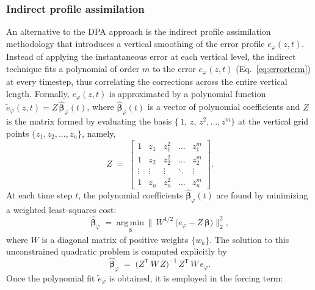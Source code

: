 \subsubsection{Indirect profile assimilation}
\label{subsec:ipa}
An alternative to the DPA approach is the indirect profile assimilation methodology \citep{allaerts2020development} that introduces a vertical smoothing of the error profile $e_\varphi(z,t)$. Instead of applying the instantaneous error at each vertical level, the indirect technique fits a polynomial of order \(m\) to the error $e_\varphi(z,t)$ (Eq.~\ref{eq:errorterm}) at every timestep, thus correlating the corrections across the entire vertical length. Formally, \(e_{\varphi}(z,t)\) is approximated by a polynomial function
\(\widetilde{e}_{\varphi}(z,t) = Z\,\hat{\boldsymbol{\beta}}_{\varphi}(t)\), where \(\hat{\boldsymbol{\beta}}_{\varphi}(t)\)
is a vector of polynomial coefficients and \(Z\) is the matrix formed by evaluating the basis \( \{\,1,\,z,\,z^{2},\dots,z^{m}\} \) at the vertical grid points \(\{z_{1},z_{2},\dots,z_{n}\}\), namely,
%
\begin{equation*}
  Z \;=\;
  \begin{bmatrix}
    1      & z_{1}   & z_{1}^{2} & \dots  & z_{1}^{m}\\
    1      & z_{2}   & z_{2}^{2} & \dots  & z_{2}^{m}\\
    \vdots & \vdots  & \vdots    & \ddots & \vdots   \\
    1      & z_{n}   & z_{n}^{2} & \dots  & z_{n}^{m}
  \end{bmatrix}.
\end{equation*}
%
At each time step \(t\), the polynomial coefficients \(\hat{\boldsymbol{\beta}}_{\varphi}(t)\) are found by
minimizing a weighted least-squares cost:
%
\begin{equation}
  \hat{\boldsymbol{\beta}}_{\varphi} \;=\;
  \underset{\boldsymbol{\beta}}{\mathrm{arg\,min}}\,
    \bigl\|\,W^{\!1/2}\,\bigl(e_{\varphi} - Z\,\boldsymbol{\beta}\bigr)\bigr\|_{2}^{2},
\end{equation}
%
where \(W\) is a diagonal matrix of positive weights \(\{w_{k}\}\).  The solution to this unconstrained quadratic
problem is computed explicitly by
%
\begin{equation}
  \hat{\boldsymbol{\beta}}_{\varphi}
  \;=\;
  \bigl(Z^{\mathsf{T}}\,W\,Z\bigr)^{-1}\,Z^{\mathsf{T}}\,W\,e_{\varphi}.
\end{equation}
%
Once the polynomial fit \(\widetilde{e}_{\varphi}\) is obtained, it is employed in the forcing term:
%
